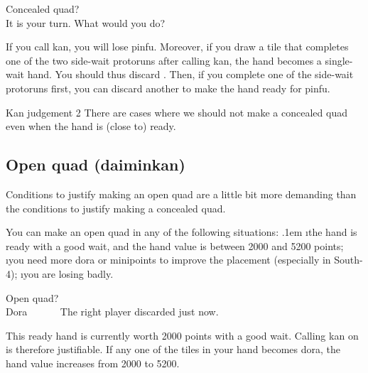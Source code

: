 \bigskip
\begin{itembox}[r]{Concealed quad?}
\bp
{}\\
\ep
\vspace{-5pt}It is your turn. What would you do?
\end{itembox}

\bigskip
If you call {\jap kan}, you will lose {\jap pinfu}. Moreover, if you draw a tile that completes one of the two side-wait protoruns after calling {\jap kan}, the hand becomes a single-wait hand. You should thus discard {\LARGE{}}. Then, if you complete one of the side-wait protoruns first, you can discard another {\LARGE{}} to make the hand ready for {\jap pinfu}. 

\bigskip
\begin{itembox}[c]{{\jap Kan} judgement 2}
There are cases where we should not make a concealed quad even when the hand is (close to) ready.
\end{itembox}

\bigskip
\subsection{Open quad ({\jap daiminkan})}
Conditions to justify making an open quad are a little bit more demanding than the conditions to justify making a concealed quad. 

\bigskip
You can make an open quad in any of the following situations:
\bi \itemsep.1em
\i the hand is ready with a good wait, and the hand value is between 2000 and 5200 points;
\i you need more {\jap dora} or minipoints to improve the placement (especially in South-4);
\i you are losing badly.
\ei

\bigskip
\begin{itembox}[r]{Open quad?}
\bp
{}\zhong\zhong\zhong~~~\\
\hfill\footnotesize{{\jap Dora}~~~~~~}
\ep
\vspace{-15pt}The right player discarded {\LARGE\zhong} just now.
\end{itembox}

\bigskip
This ready hand is currently worth 2000 points with a good wait. Calling {\jap kan} on {\LARGE\zhong} is therefore justifiable. If any one of the tiles in your hand becomes {\jap dora}, the hand value increases from 2000 to 5200. 

